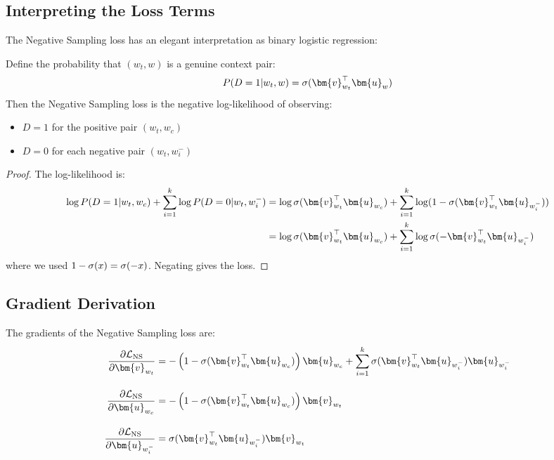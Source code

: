 \begin{notechapter}
\subsection{Interpreting the Loss Terms}

The Negative Sampling loss has an elegant interpretation as binary logistic regression:

\begin{proposition}
Define the probability that $(w_t, w)$ is a genuine context pair:
\begin{equation}
P(D = 1 | w_t, w) = \sigmoid(\bm{v}_{w_t}^\top \bm{u}_w)
\end{equation}
Then the Negative Sampling loss is the negative log-likelihood of observing:
\begin{itemize}
    \item $D = 1$ for the positive pair $(w_t, w_c)$
    \item $D = 0$ for each negative pair $(w_t, w_i^-)$
\end{itemize}
\end{proposition}

\begin{proof}
The log-likelihood is:
\begin{align}
\log P(D=1 | w_t, w_c) + \sum_{i=1}^k \log P(D=0 | w_t, w_i^-) &= \log \sigmoid(\bm{v}_{w_t}^\top \bm{u}_{w_c}) + \sum_{i=1}^k \log(1 - \sigmoid(\bm{v}_{w_t}^\top \bm{u}_{w_i^-})) \\
&= \log \sigmoid(\bm{v}_{w_t}^\top \bm{u}_{w_c}) + \sum_{i=1}^k \log \sigmoid(-\bm{v}_{w_t}^\top \bm{u}_{w_i^-})
\end{align}
where we used $1 - \sigma(x) = \sigma(-x)$. Negating gives the loss.
\end{proof}

\subsection{Gradient Derivation}

\begin{proposition}
\label{contrastive-rigorous:prop:ns_gradients}
The gradients of the Negative Sampling loss are:
\begin{align}
\frac{\partial \loss_{\text{NS}}}{\partial \bm{v}_{w_t}} &= -\left(1 - \sigmoid(\bm{v}_{w_t}^\top \bm{u}_{w_c})\right) \bm{u}_{w_c} + \sum_{i=1}^{k} \sigmoid(\bm{v}_{w_t}^\top \bm{u}_{w_i^-}) \bm{u}_{w_i^-} \\[1em]
\frac{\partial \loss_{\text{NS}}}{\partial \bm{u}_{w_c}} &= -\left(1 - \sigmoid(\bm{v}_{w_t}^\top \bm{u}_{w_c})\right) \bm{v}_{w_t} \\[1em]
\frac{\partial \loss_{\text{NS}}}{\partial \bm{u}_{w_i^-}} &= \sigmoid(\bm{v}_{w_t}^\top \bm{u}_{w_i^-}) \bm{v}_{w_t}
\end{align}
\end{proposition}


\end{notechapter}
